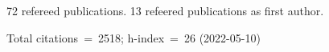72 refereed publications. 13 refeered publications as first author.

Total citations~=~2518; h-index~=~26 (2022-05-10)